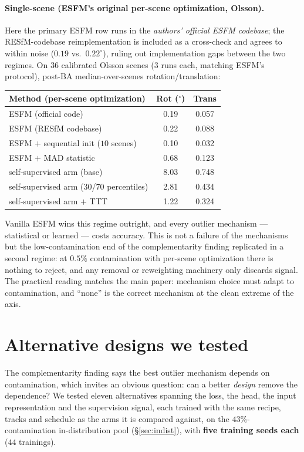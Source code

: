 \documentclass[10pt,twocolumn,letterpaper]{article}
\renewcommand{\deg}{^{\circ}}
\begin{document}
\paragraph{Single-scene (ESFM's original per-scene optimization, Olsson).} Here the
primary ESFM row runs in the \emph{authors' official ESFM codebase}; the RESfM-codebase
reimplementation is included as a cross-check and agrees to within noise ($0.19$ vs.\
$0.22\deg$), ruling out implementation gaps between the two regimes. On $36$ calibrated
Olsson scenes ($3$ runs each, matching ESFM's protocol), post-BA median-over-scenes
rotation/translation:
\begin{center}\footnotesize
\begin{tabular}{lcc}
\toprule
Method (per-scene optimization) & Rot ($\deg$) & Trans\\
\midrule
ESFM (official code)            & 0.19 & 0.057\\
ESFM (RESfM codebase)           & 0.22 & 0.088\\
ESFM $+$ sequential init ($10$ scenes) & 0.10 & 0.032\\
ESFM $+$ MAD statistic          & 0.68 & 0.123\\
self-supervised arm (base)      & 8.03 & 0.748\\
self-supervised arm (30/70 percentiles) & 2.81 & 0.434\\
self-supervised arm $+$ TTT     & 1.22 & 0.324\\
\bottomrule
\end{tabular}
\end{center}
Vanilla ESFM wins this regime outright, and every outlier mechanism --- statistical or
learned --- costs accuracy. This is not a failure of the mechanisms but the
low-contamination end of the complementarity finding replicated in a second regime: at
$0.5\%$ contamination with per-scene optimization there is nothing to reject, and any
removal or reweighting machinery only discards signal. The practical reading matches
the main paper: mechanism choice must adapt to contamination, and ``none'' is the
correct mechanism at the clean extreme of the axis.


\section{Alternative designs we tested}\label{app:altdesigns}
The complementarity finding says the best outlier mechanism depends on contamination,
which invites an obvious question: can a better \emph{design} remove the dependence?
We tested eleven alternatives spanning the loss, the head, the input representation and
the supervision signal, each trained with the same recipe, tracks and schedule as the
arms it is compared against, on the $43\%$-contamination in-distribution pool
(\S\ref{sec:indist}), with \textbf{five training seeds each} ($44$ trainings).
\end{document}
